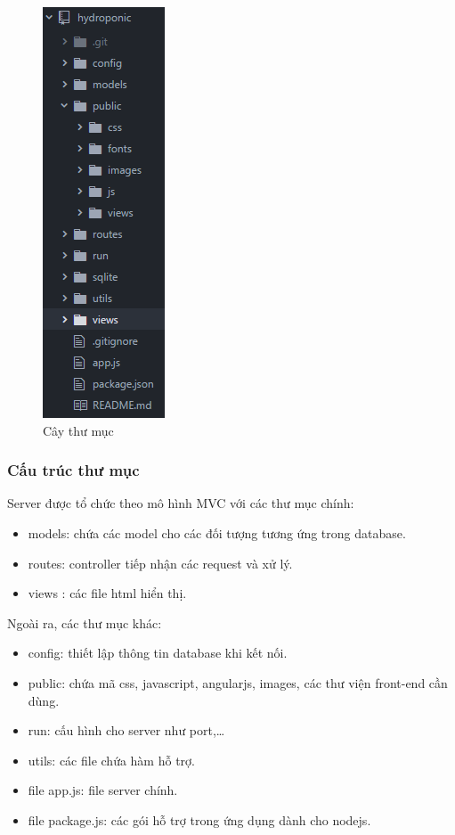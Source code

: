 \documentclass[a4paper,12pt,oneside]{article}
\begin{document}
\begin{center}
\begin{figure}[htp]
\begin{center}
\includegraphics[scale=1.]{hinh/folder.png}
\end{center}
\caption{Cây thư mục}
\end{figure}
\end{center}
\subsubsection{Cấu trúc thư mục}

Server được tổ chức theo mô hình MVC với các thư mục chính:
\begin{itemize}
\item models: chứa các model cho các đối tượng tương ứng trong database.
\item routes: controller tiếp nhận các request và xử lý.
\item views : các file html hiển thị.
\end{itemize}

Ngoài ra, các thư mục khác:
\begin{itemize}
\item config: thiết lập thông tin database khi kết nối.
\item public: chứa mã css, javascript, angularjs, images, các thư viện front-end cần dùng.
\item run: cấu hình cho server như port,…
\item utils: các file chứa hàm hỗ trợ.
\item file app.js: file server chính.
\item file package.js: các gói hỗ trợ trong ứng dụng dành cho nodejs.
\end{itemize}
\end{document}
